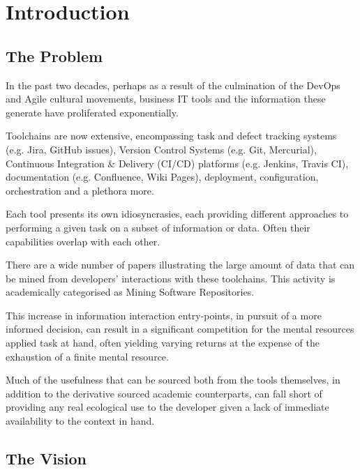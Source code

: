 \chapter{Introduction}

\section{The Problem}

In the past two decades, perhaps as a result of the culmination of the DevOps and Agile cultural movements, business IT tools and the information these generate have proliferated exponentially.  %

Toolchains are now extensive, encompassing task and defect tracking systems (e.g. Jira, GitHub issues), Version Control Systems (e.g. Git, Mercurial), Continuous Integration \& Delivery (CI/CD) platforms (e.g. Jenkins, Travis CI), documentation (e.g. Confluence, Wiki Pages), deployment, configuration, orchestration and a plethora more.


Each tool presents its own idiosyncrasies, each providing different approaches to performing a given task on a subset of information or data. Often their capabilities overlap with each other.

There are a wide number of papers illustrating the large amount of data that can be mined from developers' interactions with these toolchains. This activity is academically categorised as Mining Software Repositories.


This increase in information interaction entry-points, in pursuit of a more informed decision, can result in a significant competition for the mental resources applied task at hand, often yielding varying returns at the expense of the exhaustion of a finite mental resource.

Much of the usefulness that can be sourced both from the tools themselves, in addition to the derivative sourced academic counterparts, can fall short of providing any real ecological use to the developer given a lack of immediate availability to the context in hand.

\section{The Vision}

